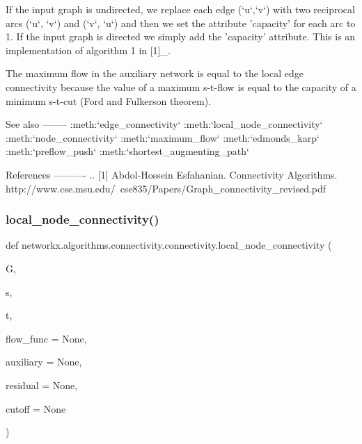 \begin{DoxyVerb}
If the input graph is undirected, we replace each edge (`u`,`v`) with
two reciprocal arcs (`u`, `v`) and (`v`, `u`) and then we set the attribute
'capacity' for each arc to 1. If the input graph is directed we simply
add the 'capacity' attribute. This is an implementation of algorithm 1
in [1]_.

The maximum flow in the auxiliary network is equal to the local edge
connectivity because the value of a maximum s-t-flow is equal to the
capacity of a minimum s-t-cut (Ford and Fulkerson theorem).

See also
--------
:meth:`edge_connectivity`
:meth:`local_node_connectivity`
:meth:`node_connectivity`
:meth:`maximum_flow`
:meth:`edmonds_karp`
:meth:`preflow_push`
:meth:`shortest_augmenting_path`

References
----------
.. [1] Abdol-Hossein Esfahanian. Connectivity Algorithms.
    http://www.cse.msu.edu/~cse835/Papers/Graph_connectivity_revised.pdf\end{DoxyVerb}
 \mbox{\label{namespacenetworkx_1_1algorithms_1_1connectivity_1_1connectivity_aca19289f3fde41022449704a6c274c3d}} 
\subsubsection{\texorpdfstring{local\+\_\+node\+\_\+connectivity()}{local\_node\_connectivity()}}
{\footnotesize\ttfamily def networkx.\+algorithms.\+connectivity.\+connectivity.\+local\+\_\+node\+\_\+connectivity (\begin{DoxyParamCaption}\item[{}]{G,  }\item[{}]{s,  }\item[{}]{t,  }\item[{}]{flow\+\_\+func = {\ttfamily None},  }\item[{}]{auxiliary = {\ttfamily None},  }\item[{}]{residual = {\ttfamily None},  }\item[{}]{cutoff = {\ttfamily None} }\end{DoxyParamCaption})}


